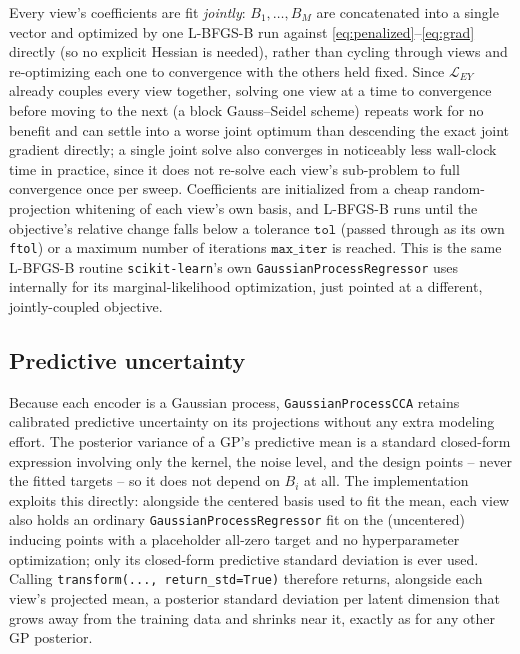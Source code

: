 \documentclass[11pt]{article}
\begin{document}
Every view's coefficients are fit \emph{jointly}: $B_1, \dots, B_M$ are concatenated into a single vector and optimized by one L-BFGS-B run against \eqref{eq:penalized}--\eqref{eq:grad} directly (so no explicit Hessian is needed), rather than cycling through views and re-optimizing each one to convergence with the others held fixed. Since $\mathcal{L}_{EY}$ already couples every view together, solving one view at a time to convergence before moving to the next (a block Gauss--Seidel scheme) repeats work for no benefit and can settle into a worse joint optimum than descending the exact joint gradient directly; a single joint solve also converges in noticeably less wall-clock time in practice, since it does not re-solve each view's sub-problem to full convergence once per sweep. Coefficients are initialized from a cheap random-projection whitening of each view's own basis, and L-BFGS-B runs until the objective's relative change falls below a tolerance $\texttt{tol}$ (passed through as its own \texttt{ftol}) or a maximum number of iterations $\texttt{max\_iter}$ is reached. This is the same L-BFGS-B routine \texttt{scikit-learn}'s own \texttt{GaussianProcessRegressor} uses internally for its marginal-likelihood optimization, just pointed at a different, jointly-coupled objective.

\subsection{Predictive uncertainty}
\label{sec:uncertainty}

Because each encoder is a Gaussian process, \texttt{GaussianProcessCCA} retains calibrated predictive uncertainty on its projections without any extra modeling effort. The posterior variance of a GP's predictive mean is a standard closed-form expression involving only the kernel, the noise level, and the design points -- never the fitted targets -- so it does not depend on $B_i$ at all. The implementation exploits this directly: alongside the centered basis used to fit the mean, each view also holds an ordinary \texttt{GaussianProcessRegressor} fit on the (uncentered) inducing points with a placeholder all-zero target and no hyperparameter optimization; only its closed-form predictive standard deviation is ever used. Calling \texttt{transform(..., return\_std=True)} therefore returns, alongside each view's projected mean, a posterior standard deviation per latent dimension that grows away from the training data and shrinks near it, exactly as for any other GP posterior.
\end{document}
